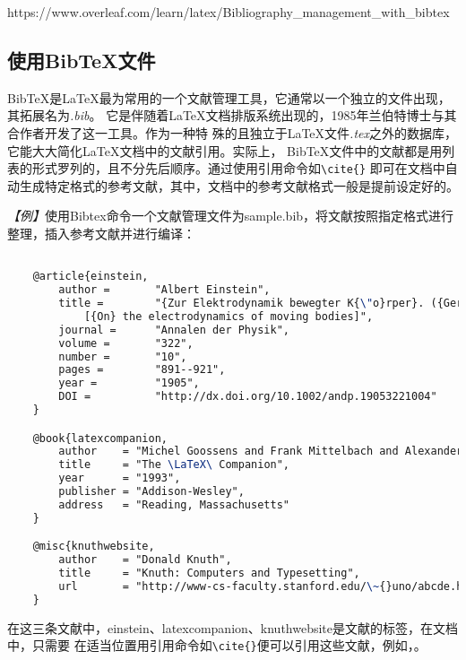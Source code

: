 \begin{tcolorbox}[colback=red!5!white, colframe=red!50!black,
        title=参考：]
    https://www.overleaf.com/learn/latex/Bibliography\_management\_with\_bibtex
\end{tcolorbox}

\subsection{使用BibTeX文件}

BibTeX是LaTeX最为常用的一个文献管理工具，它通常以一个独立的文件出现，其拓展名为\emph{.bib}。
它是伴随着LaTeX文档排版系统出现的，1985年兰伯特博士与其合作者开发了这一工具。作为一种特
殊的且独立于LaTeX文件\emph{.tex}之外的数据库，它能大大简化LaTeX文档中的文献引用。实际上，
BibTeX文件中的文献都是用列表的形式罗列的，且不分先后顺序。通过使用引用命令如\texttt{\textbackslash{}cite\{\}}
即可在文档中自动生成特定格式的参考文献，其中，文档中的参考文献格式一般是提前设定好的。

\emph{【例】}使用Bibtex命令一个文献管理文件为sample.bib，将文献按照指定格式进行整理，插入参考文献并进行编译：
\begin{lstlisting}[language=TeX]
    % 创建Bibtex文件，并将其命名为sample.bib

    @article{einstein,
        author =       "Albert Einstein",
        title =        "{Zur Elektrodynamik bewegter K{\"o}rper}. ({German})
            [{On} the electrodynamics of moving bodies]",
        journal =      "Annalen der Physik",
        volume =       "322",
        number =       "10",
        pages =        "891--921",
        year =         "1905",
        DOI =          "http://dx.doi.org/10.1002/andp.19053221004"
    }

    @book{latexcompanion,
        author    = "Michel Goossens and Frank Mittelbach and Alexander Samarin",
        title     = "The \LaTeX\ Companion",
        year      = "1993",
        publisher = "Addison-Wesley",
        address   = "Reading, Massachusetts"
    }

    @misc{knuthwebsite,
        author    = "Donald Knuth",
        title     = "Knuth: Computers and Typesetting",
        url       = "http://www-cs-faculty.stanford.edu/\~{}uno/abcde.html"
    }
\end{lstlisting}

在这三条文献中，einstein、latexcompanion、knuthwebsite是文献的标签，在文档中，只需要
在适当位置用引用命令如\texttt{\textbackslash{}cite\{\}}便可以引用这些文献，例如，。

